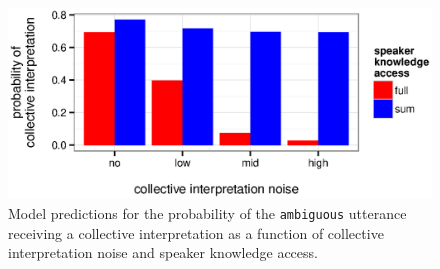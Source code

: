 \documentclass[preprint,12pt,authoryear,titlepage]{elsarticle}
\newcommand{\ndg}[1]{\textcolor{Green}{[ndg: #1]}}
\begin{document}
\begin{figure}[h]
	\centering
	\includegraphics[width=\linewidth]{plots/model-results-add.eps}
	\vspace{-20pt}
	\caption{Model predictions for the probability of the \texttt{ambiguous} utterance receiving a collective interpretation as a function of collective interpretation noise and speaker knowledge access.  
	} \label{modelresults} 
\end{figure}


\end{document}
